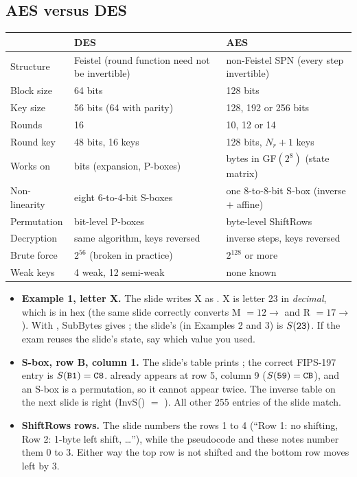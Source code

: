 \subsection{AES versus DES}
\begin{center}\small
\begin{tabularx}{\textwidth}{@{}l X X@{}}
\toprule
 & DES & AES\\
\midrule
Structure & Feistel (round function need not be invertible) & non-Feistel SPN (every step invertible)\\
Block size & 64 bits & 128 bits\\
Key size & 56 bits (64 with parity) & 128, 192 or 256 bits\\
Rounds & 16 & 10, 12 or 14\\
Round key & 48 bits, 16 keys & 128 bits, $N_r + 1$ keys\\
Works on & bits (expansion, P-boxes) & bytes in GF$(2^8)$ (state matrix)\\
Non-linearity & eight 6-to-4-bit S-boxes & one 8-to-8-bit S-box (inverse $+$ affine)\\
Permutation & bit-level P-boxes & byte-level ShiftRows\\
Decryption & same algorithm, keys reversed & inverse steps, keys reversed\\
Brute force & $2^{56}$ (broken in practice) & $2^{128}$ or more\\
Weak keys & 4 weak, 12 semi-weak & none known\\
\bottomrule
\end{tabularx}
\end{center}

\begin{fixbox}
\begin{itemize}
  \item \textbf{Example 1, letter X.} The slide writes X as . X is letter 23 in \emph{decimal}, which is  in hex (the same slide correctly converts M $= 12 \to$  and R $= 17 \to$ ). With , SubBytes gives ; the slide's  (in Examples 2 and 3) is $S(\texttt{23})$. If the exam reuses the slide's state, say which value you used.
  \item \textbf{S-box, row B, column 1.} The slide's table prints ; the correct FIPS-197 entry is $S(\texttt{B1}) = \texttt{C8}$.  already appears at row 5, column 9 ($S(\texttt{59}) = \texttt{CB}$), and an S-box is a permutation, so it cannot appear twice. The inverse table on the next slide is right (InvS() $=$ ). All other 255 entries of the slide match.
  \item \textbf{ShiftRows rows.} The slide numbers the rows 1 to 4 (``Row 1: no shifting, Row 2: 1-byte left shift, \dots''), while the pseudocode and these notes number them 0 to 3. Either way the top row is not shifted and the bottom row moves left by 3.
\end{itemize}
\end{fixbox}
